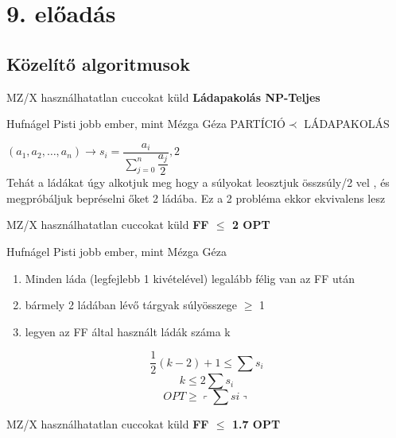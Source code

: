 \section{9. előadás}

\subsection{Közelítő algoritmusok}

\begin{tetel}{MZ/X használhatatlan cuccokat küld}
 \textbf{Ládapakolás NP-Teljes  } \\[3pt]
 \end{tetel}

	 \begin{bizonyitas}{Hufnágel Pisti jobb ember, mint Mézga Géza}
    PARTÍCIÓ$\prec$ LÁDAPAKOLÁS

	 $(a_1,a_2,\ldots,a_n) \rightarrow s_i = \dfrac{a_i}{\sum\limits_{j=0}^n \dfrac{a_j}{2 }} , 2$\\[3pt]
	 Tehát a ládákat úgy alkotjuk meg hogy a súlyokat leosztjuk összsúly/2 vel , és megpróbáljuk bepréselni őket 2 ládába. Ez a 2 probléma ekkor ekvivalens lesz\\[0pt]
\end{bizonyitas}

	 \begin{tetel}{MZ/X használhatatlan cuccokat küld}
    \textbf{FF $\leq$ 2 OPT } \\[3pt]
    \end{tetel}

	 \begin{bizonyitas}{Hufnágel Pisti jobb ember, mint Mézga Géza}

			 \begin{enumerate}[itemsep=1mm]
			 	\item Minden láda (legfejlebb 1 kivételével) legalább félig van az FF után
			 	\item bármely 2 ládában lévő tárgyak súlyösszege $\geq$ 1
			 	\item legyen az FF által használt ládák száma k
			 \end{enumerate}
	 $$\dfrac{1}{2} (k-2) + 1 \leq \sum s_i$$ %
	 $$ k \leq 2 \sum s_i$$
	 $$ OPT \geq \left\ulcorner \sum si \right\urcorner$$ %
\end{bizonyitas}

	 \begin{tetel}{MZ/X használhatatlan cuccokat küld}
    \textbf{FF $\leq$ 1.7 OPT } \\[3pt]
    \end{tetel}

